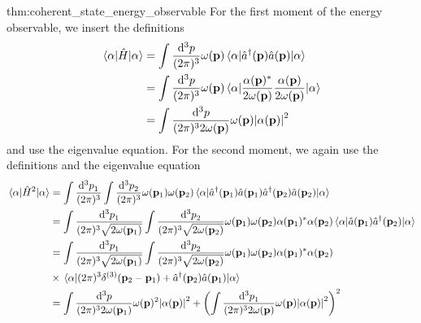 \begin{delayedproof}{thm:coherent_state_energy_observable}
	For the first moment of the energy observable, we insert the definitions
	\begin{equation*}
		\begin{split}
			\expval{\hat{H}}{\alpha}
			&=
			\int\frac{\dd[3]{p}}{(2\pi)^3}
			\omega(\vb{p})
			\expval{\hat{a}^\dagger(\vb{p})\hat{a}(\vb{p})}{\alpha}
			\\
			&=
			\int\frac{\dd[3]{p}}{(2\pi)^3}
			\omega(\vb{p})
			\expval{\frac{\alpha(\vb{p})^*}{2\omega(\vb{p})}\frac{\alpha(\vb{p})}{2\omega(\vb{p})}}{\alpha}
			\\
			&=
			\int\frac{\dd[3]{p}}{(2\pi)^32\omega(\vb{p})}
			\omega(\vb{p})
			\abs{\alpha(\vb{p})}^2
		\end{split}
	\end{equation*}
	and use the eigenvalue equation. For the second moment, we again use the definitions and the eigenvalue equation
	\begin{equation*}
		\begin{split}
			\expval{\hat{H}^2}{\alpha}
			&=
			\int\frac{\dd[3]{p}_1}{(2\pi)^3}
			\int\frac{\dd[3]{p}_2}{(2\pi)^3}
			\omega(\vb{p}_1)
			\omega(\vb{p}_2)
			\expval{
				\hat{a}^\dagger(\vb{p}_1)
				\hat{a}(\vb{p}_1)
				\hat{a}^\dagger(\vb{p}_2)
				\hat{a}(\vb{p}_2)
			}{\alpha}
			\\
			&=
			\int\frac{\dd[3]{p}_1}{(2\pi)^3\sqrt{2\omega(\vb{p}_1)}}
			\int\frac{\dd[3]{p}_2}{(2\pi)^3\sqrt{2\omega(\vb{p}_2)}}
			\omega(\vb{p}_1)
			\omega(\vb{p}_2)
			\alpha(\vb{p}_1)^*
			\alpha(\vb{p}_2)
			\expval{
				\hat{a}(\vb{p}_1)
				\hat{a}^\dagger(\vb{p}_2)
			}{\alpha}
			\\
			&=
			\int\frac{\dd[3]{p}_1}{(2\pi)^3\sqrt{2\omega(\vb{p}_1)}}
			\int\frac{\dd[3]{p}_2}{(2\pi)^3\sqrt{2\omega(\vb{p}_2)}}
			\omega(\vb{p}_1)
			\omega(\vb{p}_2)			
			\alpha(\vb{p}_1)^*
			\alpha(\vb{p}_2)
			\\
			&\times
			\expval{
				(2\pi)^3
				\delta^{(3)}(\vb{p}_2-\vb{p}_1)
				+
				\hat{a}^\dagger(\vb{p}_2)
				\hat{a}(\vb{p}_1)
			}{\alpha}
			\\
			&=
			\int\frac{\dd[3]{p}}{(2\pi)^32\omega(\vb{p}_1)}
			\omega(\vb{p})^2
			\abs{\alpha(\vb{p})}^2
			+
			\left(
				\int\frac{\dd[3]{p}_1}{(2\pi)^32\omega(\vb{p})}
				\omega(\vb{p})
				\abs{\alpha(\vb{p})}^2
			\right)^2
		\end{split}
	\end{equation*}
\end{delayedproof}
